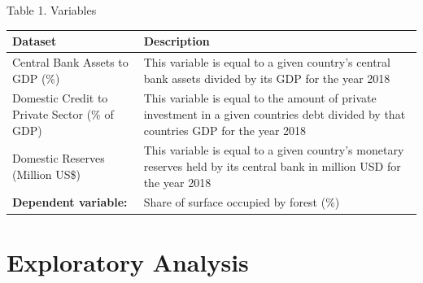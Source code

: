 \documentclass[
  12pt,
]{article}
\begin{document}
Table 1. Variables

\begin{longtable}[]{@{}ll@{}}
\toprule
\begin{minipage}[b]{0.54\columnwidth}\raggedright
Dataset\strut
\end{minipage} & \begin{minipage}[b]{0.40\columnwidth}\raggedright
Description\strut
\end{minipage}\tabularnewline
\midrule
\endhead
\begin{minipage}[t]{0.54\columnwidth}\raggedright
Central Bank Assets to GDP (\%)\strut
\end{minipage} & \begin{minipage}[t]{0.40\columnwidth}\raggedright
This variable is equal to a given country's central bank assets divided
by its GDP for the year 2018\strut
\end{minipage}\tabularnewline
\begin{minipage}[t]{0.54\columnwidth}\raggedright
Domestic Credit to Private Sector (\% of GDP)\strut
\end{minipage} & \begin{minipage}[t]{0.40\columnwidth}\raggedright
This variable is equal to the amount of private investment in a given
countries debt divided by that countries GDP for the year 2018\strut
\end{minipage}\tabularnewline
\begin{minipage}[t]{0.54\columnwidth}\raggedright
Domestic Reserves (Million US\$)\strut
\end{minipage} & \begin{minipage}[t]{0.40\columnwidth}\raggedright
This variable is equal to a given country's monetary reserves held by
its central bank in million USD for the year 2018\strut
\end{minipage}\tabularnewline
\begin{minipage}[t]{0.54\columnwidth}\raggedright
\textbf{Dependent variable:}\strut
\end{minipage} & \begin{minipage}[t]{0.40\columnwidth}\raggedright
Share of surface occupied by forest (\%)\strut
\end{minipage}\tabularnewline
\bottomrule
\end{longtable}

\newpage

\hypertarget{exploratory-analysis}{%
\section{Exploratory Analysis}\label{exploratory-analysis}}
\end{document}
